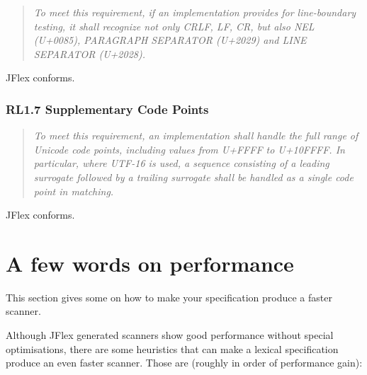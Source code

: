 \documentclass[11pt]{scrartcl}
\begin{document}
\begin{quote}
\emph{To meet this requirement, if an implementation provides for
line-boundary testing, it shall recognize not only CRLF, LF, CR, but
also NEL (U+0085), PARAGRAPH SEPARATOR (U+2029) and LINE SEPARATOR
(U+2028).}
\end{quote}

JFlex conforms.

\subsubsection*{RL1.7 Supplementary Code Points}

\begin{quote}
\emph{To meet this requirement, an implementation shall handle the full
range of Unicode code points, including values from U+FFFF to U+10FFFF.
In particular, where UTF-16 is used, a sequence consisting of a leading
surrogate followed by a trailing surrogate shall be handled as a single
code point in matching.}
\end{quote}

JFlex conforms.


\section{A few words on performance}
\label{PerformanceTips}\label{performance}

This section gives some  on how to make
your specification produce a faster scanner. 

Although JFlex generated scanners show good performance without
special optimisations, there are some heuristics that can make a
lexical specification produce an even faster scanner. Those are
(roughly in order of performance gain):
 
\end{document}
